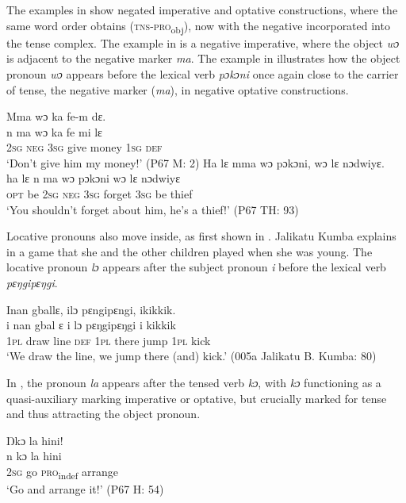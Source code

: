 The examples in  show negated imperative and optative constructions, where the same word order obtains (\textsc{tns-pro}\textsubscript{obj}), now with the negative incorporated into the tense complex. The example in  is a negative imperative, where the object \textit{wɔ} is adjacent to the negative marker \textit{ma}. The example in  illustrates how the object pronoun \textit{wɔ} appears before the lexical verb \textit{pɔkɔni} once again close to the carrier of tense, the negative marker (\textit{ma}), in negative optative constructions.

\ea%
    \label{ex:214}
    \ea\label{ex:214a} Mma wɔ ka fe-m dɛ.\\
    \gll n    ma  wɔ    ka    fe      mi    lɛ\\
    \textsc{2sg}  \textsc{neg}  \textsc{3sg}  give  money  \textsc{1sg}  \textsc{def}\\
    \glt ‘Don't give him my money!' (P67 M: 2)
    \ex\label{ex:214b} Ha lɛ mma wɔ pɔkɔni, wɔ lɛ nɔdwiyɛ.\\
    \gll ha    lɛ    n    ma  wɔ    pɔkɔni  wɔ    lɛ    nɔdwiyɛ\\
    \textsc{opt}  be    \textsc{2sg}  \textsc{neg}  \textsc{3sg}  forget    \textsc{3sg}  be    thief\\
    \glt ‘You shouldn't forget about him, he's a thief!' (P67 TH: 93)
\z
\z

Locative pronouns also move inside, as first shown in . Jalikatu Kumba explains in  a game that she and the other children played when she was young. The locative pronoun \textit{lɔ} appears after the subject pronoun \textit{i} before the lexical verb \textit{pɛŋgipɛŋgi}.

\ea%
    \label{ex:215}
    Inan gballɛ,  ilɔ pɛngipɛngi, ikikkik.\\
    \gll i    nan  gbal  ɛ    i    lɔ    pɛŋgipɛŋgi    i    kikkik\\
    \textsc{1pl}  draw  line  \textsc{def}  \textsc{1pl}  there  jump        \textsc{1pl}  kick\\
    \glt ‘We draw the line, we jump there (and) kick.' (005a Jalikatu B. Kumba: 80)
\z

In , the pronoun \textit{la} appears after the tensed verb \textit{kɔ}, with \textit{kɔ} functioning as a quasi-auxiliary marking imperative or optative, but crucially marked for tense and thus attracting the object pronoun.

\ea%
    \label{ex:216}
    Ŋkɔ la hini!\\
    \gll n    kɔ    la        hini\\
    2\textsc{sg}  go    \textsc{pro}\textsubscript{indef}    arrange\\
    \glt ‘Go and arrange it!' (P67 H: 54)
\z

